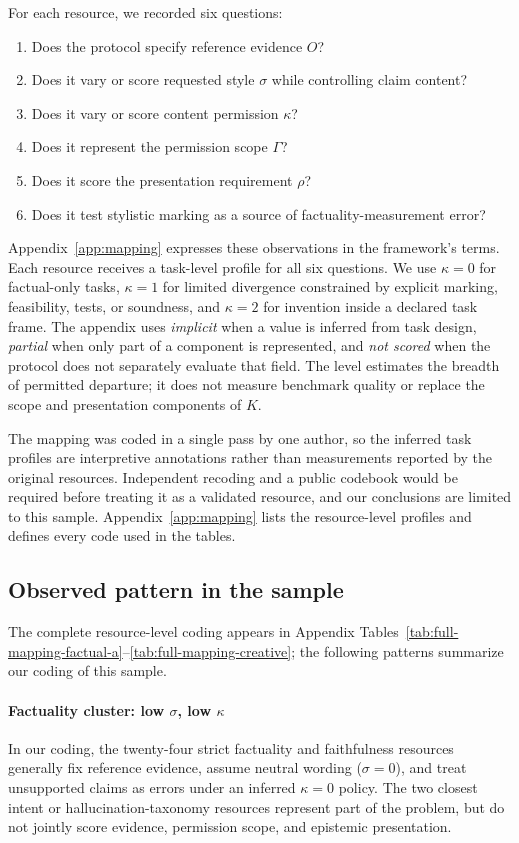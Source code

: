 \documentclass{clv2025}
\begin{document}
For each resource, we recorded six questions:
\begin{enumerate}
  \item Does the protocol specify reference evidence $O$?
  \item Does it vary or score requested style $\sigma$ while controlling claim content?
  \item Does it vary or score content permission $\kappa$?
  \item Does it represent the permission scope $\Gamma$?
  \item Does it score the presentation requirement $\rho$?
  \item Does it test stylistic marking as a source of factuality-measurement error?
\end{enumerate}

Appendix~\ref{app:mapping} expresses these observations in the framework's terms.
Each resource receives a task-level profile for all six questions.
We use $\kappa=0$ for factual-only tasks, $\kappa=1$ for limited divergence constrained by explicit marking, feasibility, tests, or soundness, and $\kappa=2$ for invention inside a declared task frame.
The appendix uses \emph{implicit} when a value is inferred from task design, \emph{partial} when only part of a component is represented, and \emph{not scored} when the protocol does not separately evaluate that field.
The level estimates the breadth of permitted departure; it does not measure benchmark quality or replace the scope and presentation components of $K$.

The mapping was coded in a single pass by one author, so the inferred task profiles are interpretive annotations rather than measurements reported by the original resources.
Independent recoding and a public codebook would be required before treating it as a validated resource, and our conclusions are limited to this sample.
Appendix~\ref{app:mapping} lists the resource-level profiles and defines every code used in the tables.

\subsection{Observed pattern in the sample}

The complete resource-level coding appears in Appendix Tables~\ref{tab:full-mapping-factual-a}--\ref{tab:full-mapping-creative}; the following patterns summarize our coding of this sample.

\paragraph{Factuality cluster: low $\sigma$, low $\kappa$}
In our coding, the twenty-four strict factuality and faithfulness resources generally fix reference evidence, assume neutral wording ($\sigma=0$), and treat unsupported claims as errors under an inferred $\kappa=0$ policy.
The two closest intent or hallucination-taxonomy resources represent part of the problem, but do not jointly score evidence, permission scope, and epistemic presentation.
\end{document}
